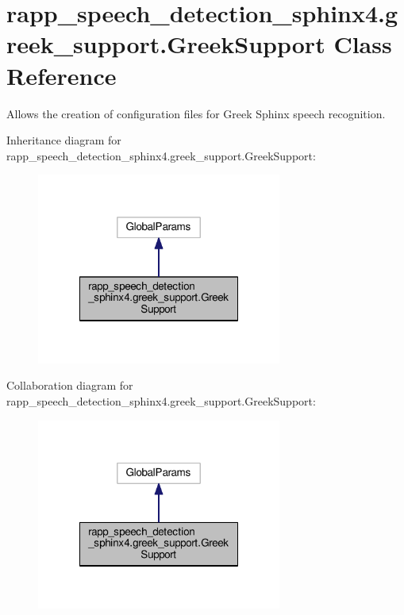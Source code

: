 \hypertarget{classrapp__speech__detection__sphinx4_1_1greek__support_1_1GreekSupport}{\section{rapp\-\_\-speech\-\_\-detection\-\_\-sphinx4.\-greek\-\_\-support.\-Greek\-Support Class Reference}
\label{classrapp__speech__detection__sphinx4_1_1greek__support_1_1GreekSupport}
}


Allows the creation of configuration files for Greek Sphinx speech recognition.  




Inheritance diagram for rapp\-\_\-speech\-\_\-detection\-\_\-sphinx4.\-greek\-\_\-support.\-Greek\-Support\-:
\nopagebreak
\begin{figure}[H]
\begin{center}
\leavevmode
\includegraphics[width=228pt]{classrapp__speech__detection__sphinx4_1_1greek__support_1_1GreekSupport__inherit__graph}
\end{center}
\end{figure}


Collaboration diagram for rapp\-\_\-speech\-\_\-detection\-\_\-sphinx4.\-greek\-\_\-support.\-Greek\-Support\-:
\nopagebreak
\begin{figure}[H]
\begin{center}
\leavevmode
\includegraphics[width=228pt]{classrapp__speech__detection__sphinx4_1_1greek__support_1_1GreekSupport__coll__graph}
\end{center}
\end{figure}
